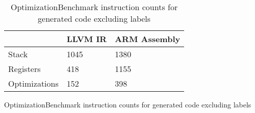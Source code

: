 \begin{table}[h!]
\centering
\begin{tabular}{p{}p{}p{}}
  \hline
 & LLVM IR & ARM Assembly \\ 
  \hline
Stack & 1045 & 1380 \\ 
  Registers & 418 & 1155 \\ 
  Optimizations & 152 & 398 \\ 
   \hline
\end{tabular}
\caption{OptimizationBenchmark instruction counts for generated code excluding labels}
\caption{OptimizationBenchmark instruction counts for generated code excluding labels}
\end{table}
